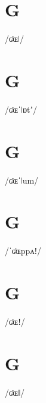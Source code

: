 \documentclass[10pt,a4paper,twoside]{book}
\begin{document}
\section*{G}

\begin{multicols}{3}
 {/ʛɶǀ/} {}
\end{multicols}

\section*{G}

\begin{multicols}{3}
 {/ʛɶˈǀɒtʼ/} {}
\end{multicols}

\section*{G}

\begin{multicols}{3}
 {/ʛɶˈǀum/} {}
\end{multicols}

\section*{G}

\begin{multicols}{3}
 {/ˈʛɶppʌǃ/} {}
\end{multicols}

\section*{G}

\begin{multicols}{3}
 {/ʛɶǃ/} {}
\end{multicols}

\section*{G}

\begin{multicols}{3}
 {/ʛɶǁ/} {}
\end{multicols}
\end{document}
